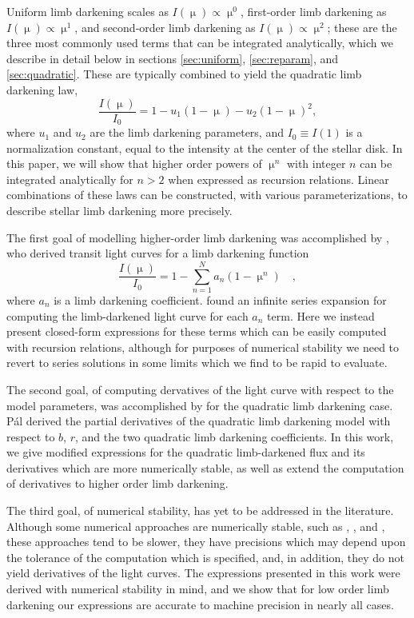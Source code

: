 \documentclass[modern]{aastex61}
\begin{document}
Uniform limb darkening scales as $I(\upmu) \propto \upmu^0$, first-order
limb darkening as $I(\upmu) \propto \upmu^1$, and second-order limb darkening
as $I(\upmu)\propto \upmu^2$; these are the three most commonly used  terms
that can be integrated analytically, which we describe in detail below
in sections \ref{sec:uniform}, \ref{sec:reparam}, and \ref{sec:quadratic}.
These are typically combined to yield the quadratic limb darkening law,
%
\begin{equation} \label{eq:quadraticld}
    \frac{I(\upmu)}{I_0} = 1-u_1 (1-\upmu) - u_2 (1-\upmu)^2,
\end{equation}
%
where $u_1$ and $u_2$ are the limb darkening parameters, and
$I_0 \equiv I(1)$ is a normalization constant, equal to the
intensity at the center of the stellar disk.
In this paper, we will show that higher order powers of $\upmu^n$ with integer
$n$ can be integrated analytically for $n > 2$ when expressed as recursion relations.
Linear combinations of these laws can be constructed,
with various parameterizations, to describe stellar limb darkening more precisely.

The first goal of modelling higher-order limb darkening was accomplished
by \citet{Gimenez2006}, who derived transit light curves for a limb darkening
function
%
\begin{equation} \label{eq:gimenez}
    \frac{I(\upmu)}{I_0} = 1-\sum_{n=1}^N a_n (1-\upmu^n) \quad,
\end{equation}
%
where $a_n$ is a limb darkening coefficient.  \cite{Gimenez2006}
found an infinite series expansion for computing the limb-darkened light curve
for each $a_n$ term.  Here we instead present closed-form expressions for these terms
which can be easily computed with recursion relations, although for purposes
of numerical stability we need to revert to series solutions in some limits
which we find to be rapid to evaluate.

The second goal, of computing dervatives of the light curve with respect to
the model parameters, was accomplished by \cite{Pal2008} for the quadratic
limb darkening case.  P\'al derived the partial derivatives of the quadratic
limb darkening model with respect to $b$, $r$, and the two quadratic
limb darkening coefficients. In this work, we give modified expressions
for the quadratic limb-darkened flux and its derivatives which are
more numerically stable, as well as extend the computation of derivatives
to higher order limb darkening.

The third goal, of numerical stability, has yet to be addressed in the literature.
Although some numerical approaches are numerically stable, such as \cite{Gimenez2006},
\cite{Kreidberg2015}, and \cite{Parviainen2015}, these approaches tend to be
slower, they have precisions which may depend upon the tolerance of the computation
which is specified, and, in addition, they do not yield derivatives of the light curves.
The expressions presented in this work were derived with numerical stability in
mind, and we show that for low order limb darkening our expressions are accurate
to machine precision in nearly all cases.
\end{document}
